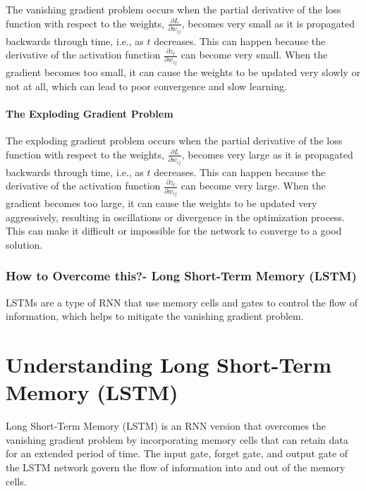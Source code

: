 \documentclass[
]{article}
\begin{document}
The vanishing gradient problem occurs when the partial derivative of the
loss function with respect to the weights,
\(\frac{\partial L}{\partial w_{ij}}\), becomes very small as it is
propagated backwards through time, i.e., as \(t\) decreases. This can
happen because the derivative of the activation function
\(\frac{\partial z_t}{\partial w_{ij}}\) can become very small. When the
gradient becomes too small, it can cause the weights to be updated very
slowly or not at all, which can lead to poor convergence and slow
learning.

\hypertarget{the-exploding-gradient-problem}{%
\paragraph{The Exploding Gradient
Problem}\label{the-exploding-gradient-problem}}

The exploding gradient problem occurs when the partial derivative of the
loss function with respect to the weights,
\(\frac{\partial L}{\partial w_{ij}}\), becomes very large as it is
propagated backwards through time, i.e., as \(t\) decreases. This can
happen because the derivative of the activation function
\(\frac{\partial z_t}{\partial w_{ij}}\) can become very large. When the
gradient becomes too large, it can cause the weights to be updated very
aggressively, resulting in oscillations or divergence in the
optimization process. This can make it difficult or impossible for the
network to converge to a good solution.

\hypertarget{how-to-overcome-this--long-short-term-memory-lstm}{%
\subsubsection{How to Overcome this?- Long Short-Term Memory
(LSTM)}\label{how-to-overcome-this--long-short-term-memory-lstm}}

LSTMs are a type of RNN that use memory cells and gates to control the
flow of information, which helps to mitigate the vanishing gradient
problem.

\hypertarget{understanding-long-short-term-memory-lstm}{%
\section{Understanding Long Short-Term Memory
(LSTM)}\label{understanding-long-short-term-memory-lstm}}

Long Short-Term Memory (LSTM) is an RNN version that overcomes the
vanishing gradient problem by incorporating memory cells that can retain
data for an extended period of time. The input gate, forget gate, and
output gate of the LSTM network govern the flow of information into and
out of the memory cells.
\end{document}
